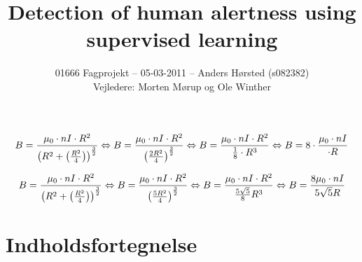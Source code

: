\documentclass[11pt]{article}
\title{Detection of human alertness using supervised learning}
\author{01666 Fagprojekt -- 05-03-2011 -- Anders Hørsted (s082382) \\  Vejledere: Morten Mørup og Ole Winther}
\date{} %
\begin{document}
    
    \thispagestyle{empty}
    \maketitle
    
    \pagebreak
    
    \begin{equation}
        B=\frac{\mu_{0}\cdot nI\cdot R^{2}}{\left(R^{2}+\left(\frac{R^{2}}{4}\right)\right)^{\frac{3}{2}}}\newline\Leftrightarrow
B=\frac{\mu_{0}\cdot nI\cdot R^{2}}{\left(\frac{2R^{2}}{4}\right)^{\frac{3}{2}}}\newline\Leftrightarrow B=\frac{\mu_{0}\cdot nI\cdot R^{2}}{\frac{1}{8}\cdot R^{3}}\newline\Leftrightarrow B=8\cdot \frac{\mu_{0}\cdot nI}{\cdot R}
    \end{equation}
    
    \begin{equation}
        B=\frac{\mu_{0}\cdot nI\cdot R^{2}}{\left(R^{2}+\left(\frac{R^{2}}{4}\right)\right)^{\frac{3}{2}}}\newline\Leftrightarrow
        B=\frac{\mu_{0}\cdot nI\cdot R^{2}}{\left(\frac{5R^2}{4}\right)^\frac{3}{2}}\newline\Leftrightarrow
        B=\frac{\mu_{0}\cdot nI\cdot R^{2}}{\frac{5\sqrt{5}}{8}R^3}\newline\Leftrightarrow
        B=\frac{8\mu_{0}\cdot nI}{5\sqrt{5}R}
    \end{equation}
    
    
    
    

    \pagebreak
    
    
    
    \pagebreak
    
    
    
    \pagebreak
    
    \section*{Indholdsfortegnelse}
    \setcounter{tocdepth}{3}
    \renewcommand*\contentsname{}
    \tableofcontents
    
    \pagebreak
    
    
    
    \pagebreak
    
    
    
    \pagebreak
    
    
    
    
    
    
    
\end{document}
